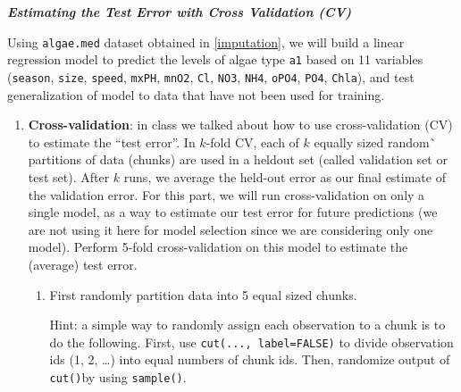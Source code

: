 \documentclass[]{article}
\newenvironment{Shaded}{\begin{snugshade}}{\end{snugshade}}
\newcommand{\KeywordTok}[1]{\textcolor[rgb]{0.13,0.29,0.53}{\textbf{#1}}}
\newcommand{\DataTypeTok}[1]{\textcolor[rgb]{0.13,0.29,0.53}{#1}}
\newcommand{\DecValTok}[1]{\textcolor[rgb]{0.00,0.00,0.81}{#1}}
\newcommand{\StringTok}[1]{\textcolor[rgb]{0.31,0.60,0.02}{#1}}
\newcommand{\OtherTok}[1]{\textcolor[rgb]{0.56,0.35,0.01}{#1}}
\newcommand{\OperatorTok}[1]{\textcolor[rgb]{0.81,0.36,0.00}{\textbf{#1}}}
\newcommand{\NormalTok}[1]{#1}
\begin{document}
\textbf{\emph{Estimating the Test Error with Cross Validation (CV)}}

Using \texttt{algae.med} dataset obtained in \eqref{imputation}, we will
build a linear regression model to predict the levels of algae type
\texttt{a1} based on 11 variables (\texttt{season}, \texttt{size},
\texttt{speed}, \texttt{mxPH}, \texttt{mnO2}, \texttt{Cl}, \texttt{NO3},
\texttt{NH4}, \texttt{oPO4}, \texttt{PO4}, \texttt{Chla}), and test
generalization of model to data that have not been used for training.

\begin{enumerate}
\def\labelenumi{\arabic{enumi}.}
\setcounter{enumi}{3}
\item
  \textbf{Cross-validation}: in class we talked about how to use
  cross-validation (CV) to estimate the ``test error''. In \(k\)-fold
  CV, each of \(k\) equally sized random˜ partitions of data (chunks)
  are used in a heldout set (called validation set or test set). After
  \(k\) runs, we average the held-out error as our final estimate of the
  validation error. For this part, we will run cross-validation on only
  a single model, as a way to estimate our test error for future
  predictions (we are not using it here for model selection since we are
  considering only one model). Perform 5-fold cross-validation on this
  model to estimate the (average) test error.

  \begin{enumerate}
  \item
    \label{chunkids} First randomly partition data into 5 equal sized
    chunks.

    Hint: a simple way to randomly assign each observation to a chunk is
    to do the following. First, use \texttt{cut(...,\ label=FALSE)} to
    divide observation ids (1, 2, \dots ) into equal numbers of chunk
    ids. Then, randomize output of \texttt{cut()}by using
    \texttt{sample()}.
  \end{enumerate}
\end{enumerate}

\begin{Shaded}
\end{Shaded}
\end{document}
